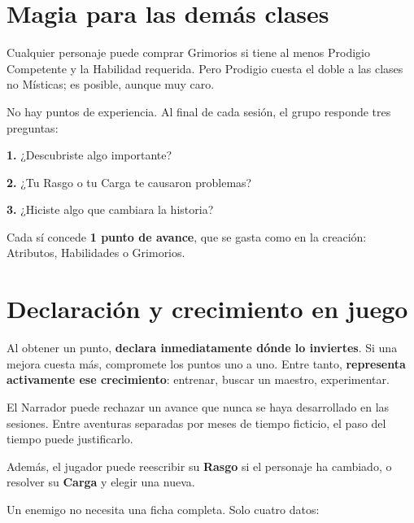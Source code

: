 \documentclass[10pt,a4paper]{article}
\begin{document}
\section*{Magia para las demás clases}
Cualquier personaje puede comprar Grimorios si tiene al menos Prodigio Competente y la Habilidad requerida. Pero Prodigio cuesta el doble a las clases no Místicas; es posible, aunque muy caro.

No hay puntos de experiencia. Al final de cada sesión, el grupo responde tres preguntas:

\textbf{1.} ¿Descubriste algo importante?

\textbf{2.} ¿Tu Rasgo o tu Carga te causaron problemas?

\textbf{3.} ¿Hiciste algo que cambiara la historia?

Cada sí concede \textbf{1 punto de avance}, que se gasta como en la creación: Atributos, Habilidades o Grimorios.

\section*{Declaración y crecimiento en juego}
Al obtener un punto, \textbf{declara inmediatamente dónde lo inviertes}. Si una mejora cuesta más, compromete los puntos uno a uno. Entre tanto, \textbf{representa activamente ese crecimiento}: entrenar, buscar un maestro, experimentar.

El Narrador puede rechazar un avance que nunca se haya desarrollado en las sesiones. Entre aventuras separadas por meses de tiempo ficticio, el paso del tiempo puede justificarlo.

Además, el jugador puede reescribir su \textbf{Rasgo} si el personaje ha cambiado, o resolver su \textbf{Carga} y elegir una nueva.

Un enemigo no necesita una ficha completa. Solo cuatro datos:
\end{document}

